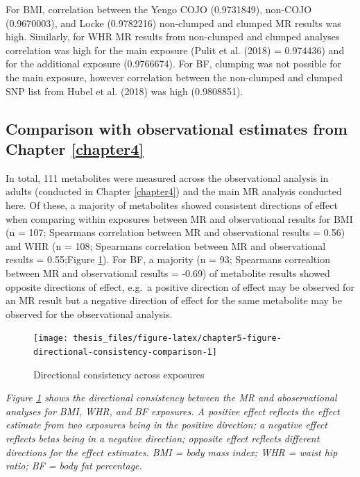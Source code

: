 \documentclass[11pt,twoside]{bristolthesis}
\newcommand{\bsmall}{\begin{small}}
\newcommand{\esmall}{\end{small}}
\begin{document}
For BMI, correlation between the Yengo COJO (0.9731849), non-COJO (0.9670003), and Locke (0.9782216) non-clumped and clumped MR results was high. Similarly, for WHR MR results from non-clumped and clumped analyses correlation was high for the main exposure (Pulit et al. (2018) = 0.974436) and for the additional exposure (0.9766674). For BF, clumping was not possible for the main exposure, however correlation between the non-clumped and clumped SNP list from Hubel et al. (2018) was high (0.9808851).

\hypertarget{comparison-with-observational-estimates-from-chapter-refchapter4}{%
\subsection{Comparison with observational estimates from Chapter \ref{chapter4}}\label{comparison-with-observational-estimates-from-chapter-refchapter4}}

In total, 111 metabolites were measured across the observational analysis in adults (conducted in Chapter \ref{chapter4}) and the main MR analysis conducted here. Of these, a majority of metabolites showed consistent directions of effect when comparing within exposures between MR and observational results for BMI (n = 107; Spearmans correlation between MR and observational results = 0.56) and WHR (n = 108; Spearmans correlation between MR and observational results = 0.55;Figure \ref{fig:chapter5-figure-directional-consistency-comparison}). For BF, a majority (n = 93; Spearmans correaltion between MR and observational results = -0.69) of metabolite results showed opposite directions of effect, e.g.~a positive direction of effect may be observed for an MR result but a negative direction of effect for the same metabolite may be observed for the observational analysis.
\begin{figure}
\texttt{[image: thesis\_files/figure-latex/chapter5-figure-directional-consistency-comparison-1]} \caption{Directional consistency across exposures}\label{fig:chapter5-figure-directional-consistency-comparison}
\end{figure}
\noindent 
\bsmall
\emph{Figure \ref{fig:chapter5-figure-directional-consistency-comparison} shows the directional consistency between the MR and aboservational analyses for BMI, WHR, and BF exposures. A positive effect reflects the effect estimate from two exposures being in the positive direction; a negative effect reflects betas being in a negative direction; opposite effect reflects different directions for the effect estimates. BMI = body mass index; WHR = waist hip ratio; BF = body fat percentage.}
\esmall
\end{document}
